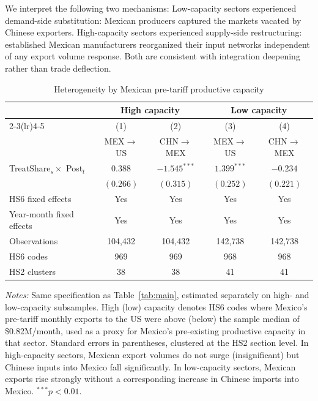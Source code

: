 \documentclass[11pt]{article}
\begin{document}
We interpret the following two mechanisms: Low-capacity sectors experienced
demand-side substitution: Mexican producers captured the markets
vacated by Chinese exporters. High-capacity sectors experienced supply-side
restructuring: established Mexican manufacturers reorganized their input
networks independent of any export volume response. Both are
consistent with integration deepening rather than trade deflection.

\begin{table}[tbp]
\centering
\caption{Heterogeneity by Mexican pre-tariff productive capacity}
\label{tab:heterogeneity}
\begin{threeparttable}

\begin{tabular}{lcccc}
\toprule
 & \multicolumn{2}{c}{High capacity}
 & \multicolumn{2}{c}{Low capacity} \\
\cmidrule(lr){2-3}\cmidrule(lr){4-5}
 & (1) & (2) & (3) & (4) \\
 & MEX$\to$US & CHN$\to$MEX & MEX$\to$US & CHN$\to$MEX \\
\midrule
TreatShare$_s \times$ Post$_t$
    & $0.388$ & $-1.545^{***}$
    & $1.399^{***}$ & $-0.234$ \\
    & $(0.266)$ & $(0.315)$
    & $(0.252)$ & $(0.221)$ \\[6pt]
\midrule
HS6 fixed effects        & Yes & Yes & Yes & Yes \\
Year-month fixed effects & Yes & Yes & Yes & Yes \\
Observations             & 104,432 & 104,432 & 142,738 & 142,738 \\
HS6 codes                & 969 & 969 & 968 & 968 \\
HS2 clusters             & 38 & 38 & 41 & 41 \\
\bottomrule
\end{tabular}

\begin{tablenotes}[flushleft]
\footnotesize
\item \textit{Notes:}
Same specification as Table~\ref{tab:main}, estimated separately on
high- and low-capacity subsamples.
High (low) capacity denotes HS6 codes where Mexico's pre-tariff monthly
exports to the US were above (below) the sample median of \$0.82M/month,
used as a proxy for Mexico's pre-existing productive capacity in that
sector.
Standard errors in parentheses, clustered at the HS2 section level.
In high-capacity sectors, Mexican export volumes do not surge
(insignificant) but Chinese inputs into Mexico fall significantly. In low-capacity sectors, Mexican exports rise strongly without a
corresponding increase in Chinese imports into Mexico.
$^{***}p < 0.01$.
\end{tablenotes}

\end{threeparttable}
\end{table}
\end{document}
